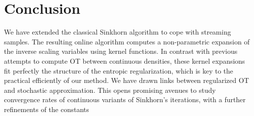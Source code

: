 
\section{Conclusion}

We have extended the classical Sinkhorn algorithm to cope with streaming samples. The resulting online algorithm computes a non-parametric expansion of the inverse scaling variables using kernel functions. In contrast with previous attempts to compute OT between continuous densities, these kernel expansions fit perfectly the structure of the entropic regularization, which is key to the practical efficiently of our method. 
%
We have drawn links between regularized OT and stochastic approximation. This opens promising avenues to study convergence rates of continuous variants of Sinkhorn's iterations, with a further refinements of the constants